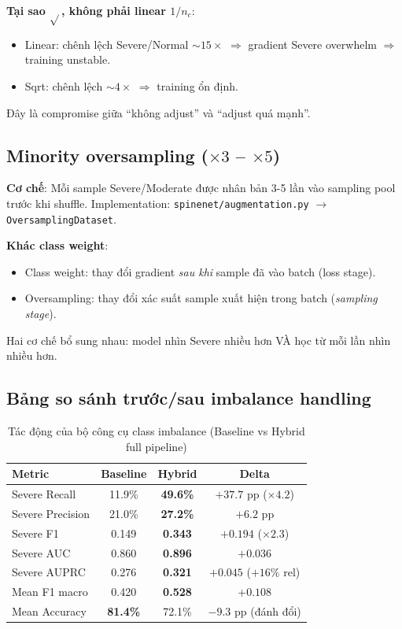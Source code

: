 \documentclass[11pt,a4paper]{article}
\newcommand{\bad}[1]{\textcolor{bad}{#1}}
\newcommand{\best}[1]{\textcolor{best}{\textbf{#1}}}
\begin{document}
\noindent\textbf{Tại sao $\sqrt{}$, không phải linear $1/n_c$}:
\begin{itemize}[leftmargin=*]
\item Linear: chênh lệch Severe/Normal $\sim 15\times$ $\Rightarrow$
gradient Severe overwhelm $\Rightarrow$ training unstable.
\item Sqrt: chênh lệch $\sim 4\times$ $\Rightarrow$ training ổn định.
\end{itemize}
Đây là compromise giữa ``không adjust'' và ``adjust quá mạnh''.

\subsection{Minority oversampling ($\times 3$ -- $\times 5$)}

\noindent\textbf{Cơ chế}: Mỗi sample Severe/Moderate được nhân bản 3-5
lần vào sampling pool trước khi shuffle. Implementation:
\verb|spinenet/augmentation.py| $\to$ \verb|OversamplingDataset|.

\noindent\textbf{Khác class weight}:
\begin{itemize}[leftmargin=*]
\item Class weight: thay đổi gradient \emph{sau khi} sample đã vào batch
(loss stage).
\item Oversampling: thay đổi xác suất sample xuất hiện trong batch
(\emph{sampling stage}).
\end{itemize}
Hai cơ chế bổ sung nhau: model nhìn Severe nhiều hơn VÀ học từ mỗi lần
nhìn nhiều hơn.

\subsection{Bảng so sánh trước/sau imbalance handling}

\begin{table}[h]
\centering
\caption{Tác động của bộ công cụ class imbalance (Baseline vs Hybrid full pipeline)}
\begin{tabular}{@{}lccc@{}}
\toprule
\rowcolor{tablehdr}
Metric              & Baseline & \best{Hybrid}   & Delta \\
\midrule
Severe Recall       & 11.9\%   & \best{49.6\%}   & $+37.7$ pp ($\times 4.2$) \\
Severe Precision    & 21.0\%   & \best{27.2\%}   & $+6.2$ pp \\
Severe F1           & 0.149    & \best{0.343}    & $+0.194$ ($\times 2.3$) \\
Severe AUC          & 0.860    & \best{0.896}    & $+0.036$ \\
Severe AUPRC        & 0.276    & \best{0.321}    & $+0.045$ ($+16\%$ rel) \\
Mean F1 macro       & 0.420    & \best{0.528}    & $+0.108$ \\
Mean Accuracy       & \best{81.4\%} & 72.1\%     & \bad{$-9.3$ pp (đánh đổi)} \\
\bottomrule
\end{tabular}
\end{table}
\end{document}
